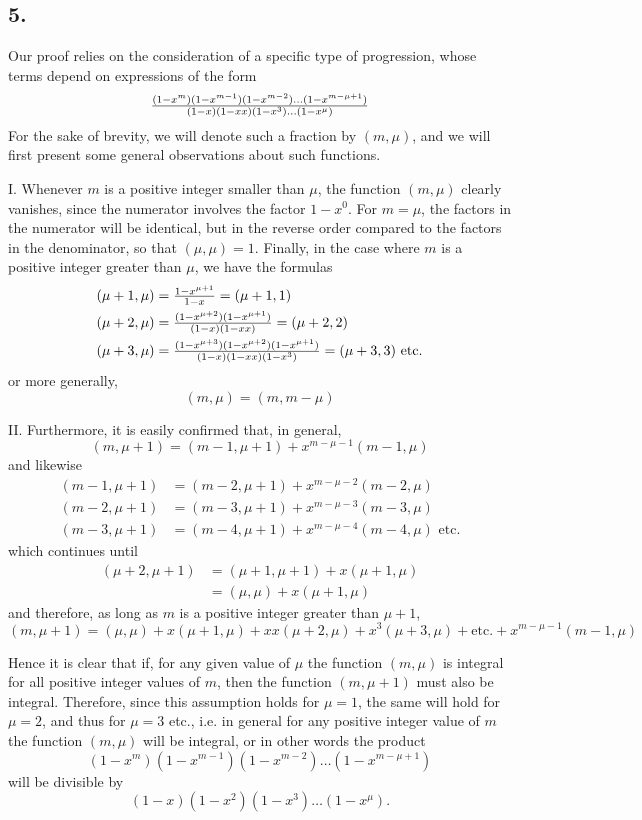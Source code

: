 \documentclass[twoside,12pt]{memoir}
\let\oldfrac\frac
\def\frac#1#2{\mathchoice{\tfrac{#1}{#2}}{\oldfrac{#1}{#2}}{\genfrac{}{}{}{2}{#1}{#2\mathstrut}}{\genfrac{}{}{}{3}{#1}{#2\mathstrut}}}
\begin{document}
\subsection*{5.}

Our proof relies on the consideration of a specific type of progression, whose terms depend on expressions of the form
\[\frac{(1-x^{m})(1-x^{m-1})(1-x^{m-2}) \ldots(1-x^{m-\mu+1})}{(1-x)(1-x x)(1-x^{3}) \ldots (1-x^{\mu})}\]
For the sake of brevity, we will denote such a fraction by \((m, \mu)\), and we will first present some general observations about such functions.
%

I. Whenever \(m\) is a positive integer smaller than \(\mu\), the function \((m, \mu)\) clearly vanishes, since the numerator involves the factor \(1-x^{0}\). For \(m = \mu\), the factors in the numerator will be identical, but in the reverse order compared to the factors in the denominator, so that \((\mu, \mu) = 1\). Finally, in the case where \(m\) is a positive integer greater than \(\mu\), we have the formulas
\[\begin{aligned}
& (\mu+1, \mu) = \frac{1-x^{\mu+1}}{1-x} = (\mu+1,1) \\
& (\mu+2, \mu) = \frac{(1-x^{\mu+2})(1-x^{\mu+1})}{(1-x)(1-x x)} = (\mu+2,2) \\
& (\mu+3, \mu) = \frac{(1-x^{\mu+3})(1-x^{\mu+2})(1-x^{\mu+1})}{(1-x)(1-xx)(1-x^{3})} = (\mu+3,3) \text{ etc{.}}
\end{aligned}\]
or more generally,
\[(m, \mu) = (m, m-\mu)\]
%

II. Furthermore, it is easily confirmed that, in general,
\[(m, \mu+1)=(m-1, \mu+1)+x^{m-\mu-1}(m-1, \mu)\]
and likewise
\[\begin{aligned}
(m-1, \mu+1)&=(m-2, \mu+1)+x^{m-\mu-2}(m-2, \mu) \\
(m-2, \mu+1)&=(m-3, \mu+1)+x^{m-\mu-3}(m-3, \mu) \\
(m-3, \mu+1)&=(m-4, \mu+1)+x^{m-\mu-4}(m-4, \mu) \text{ etc{.}}
\end{aligned}\]
which continues until
\[\begin{aligned}
(\mu+2, \mu+1) & =(\mu+1, \mu+1)+x(\mu+1, \mu) \\
& =(\mu, \mu)+x(\mu+1, \mu)
\end{aligned}\]
and therefore, as long as \(m\) is a positive integer greater than \(\mu+1\), 
\[(m, \mu+1)=(\mu, \mu) +x(\mu+1, \mu)+x x(\mu+2, \mu)+x^{3}(\mu+3, \mu)+\text{etc{.}} +x^{m-\mu-1}(m-1, \mu)\]
%

Hence it is clear that if, for any given value of \(\mu\) the function \((m, \mu)\) is integral for all positive integer values of \(m\), then the function \((m, \mu+1)\) must also be integral. Therefore, since this assumption holds for \(\mu=1\), the same will hold for \(\mu=2\), and thus for \(\mu=3\) etc{.}, i{.}e{.} in general for any positive integer value of \(m\) the function \((m, \mu)\) will be integral, or in other words the product
\[(1-x^{m})(1-x^{m-1})(1-x^{m-2}) \ldots(1-x^{m-\mu+1})\]
will be divisible by
\[(1-x)(1-x^{2})(1-x^{3}) \ldots(1-x^{\mu}).\]
%
\end{document}
